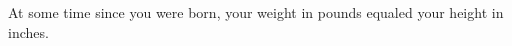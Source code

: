\documentclass{ximera}
\begin{document}
\begin{problem}
  At some time since you were born, your weight in pounds equaled your height in inches.
  \begin{multipleChoice}
  \end{multipleChoice}
\end{problem}
\end{document}
